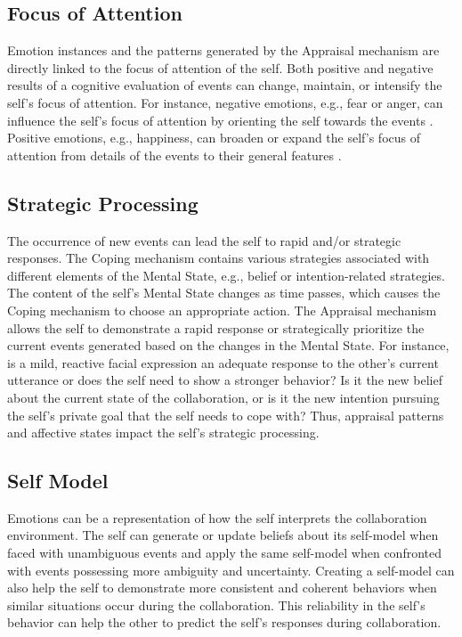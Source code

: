 \documentclass[12pt]{report}
\begin{document}
\subsection{Focus of Attention} Emotion instances and the patterns generated
by the Appraisal mechanism are directly linked to the focus of attention of the
self. Both positive and negative results of a cognitive evaluation of events can
change, maintain, or intensify the self's focus of attention. For instance,
negative emotions, e.g., fear or anger, can influence the self's focus of
attention by orienting the self towards the events
\cite{faucher:fear-attention}. Positive emotions, e.g., happiness, can broaden
or expand the self's focus of attention from details of the events to their
general features \cite{fredrickson:positive-emotion-attention}.

\subsection{Strategic Processing} The occurrence of new events can lead the
self to rapid and/or strategic responses. The Coping mechanism contains various
strategies associated with different elements of the Mental State, e.g.,
belief or intention-related strategies. The content of the self's Mental State
changes as time passes, which causes the Coping mechanism to choose an
appropriate action. The Appraisal mechanism allows the self to demonstrate a
rapid response or strategically prioritize the current events generated
based on the changes in the Mental State. For instance, is a mild, reactive
facial expression an adequate response to the other's current utterance or does
the self need to show a stronger behavior? Is it the new belief about the
current state of the collaboration, or is it the new intention pursuing the
self's private goal that the self needs to cope with? Thus, appraisal patterns
and affective states impact the self's strategic processing.

\subsection{Self Model} Emotions can be a representation of how the self
interprets the collaboration environment. The self can generate or update
beliefs about its self-model when faced with unambiguous events and apply the
same self-model when confronted with events possessing more ambiguity and
uncertainty. Creating a self-model can also help the self to demonstrate more
consistent and coherent behaviors when similar situations occur during the
collaboration. This reliability in the self's behavior can help the other to
predict the self's responses during collaboration.
\end{document}
